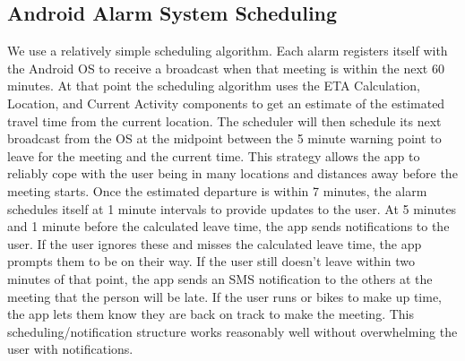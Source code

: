 \subsection{Android Alarm System Scheduling}
We use a relatively simple scheduling algorithm. Each alarm registers itself with the Android OS to receive a broadcast when that meeting is within the next 60 minutes. At that point the scheduling algorithm uses the ETA Calculation, Location, and Current Activity components to get an estimate of the estimated travel time from the current location. The scheduler will then schedule its next broadcast from the OS at the midpoint between the 5 minute warning point to leave for the meeting and the current time. This strategy allows the app to reliably cope with the user being in many locations and distances away before the meeting starts.  Once the estimated departure is within 7 minutes, the alarm schedules itself at 1 minute intervals to provide updates to the user. At 5 minutes and 1 minute before the calculated leave time, the app sends notifications to the user. If the user ignores these and misses the calculated leave time, the app prompts them to be on their way. If the user still doesn't leave within two minutes of that point, the app sends an SMS notification to the others at the meeting that the person will be late. If the user runs or bikes to make up time, the app lets them know they are back on track to make the meeting. This scheduling/notification structure works reasonably well without overwhelming the user with notifications.